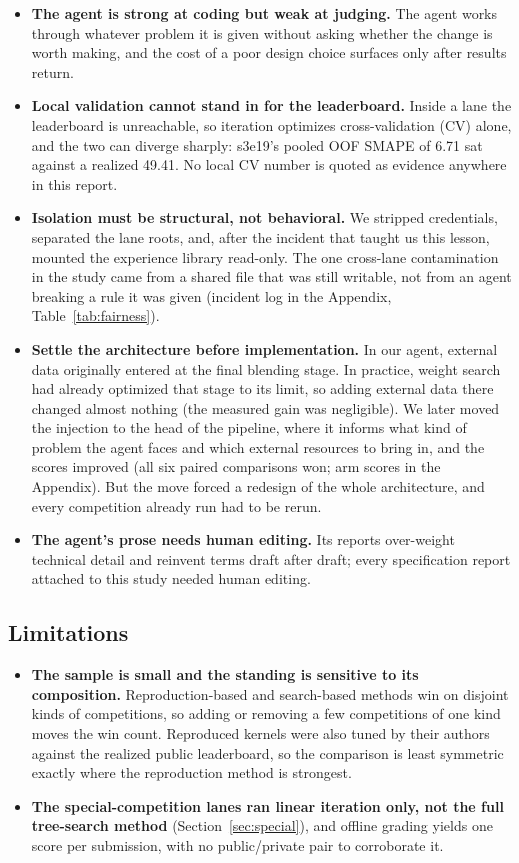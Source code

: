 \documentclass[11pt,a4paper]{article}
\begin{document}
\begin{itemize}[leftmargin=*]
  \item \textbf{The agent is strong at coding but weak at judging.} The agent works through whatever problem it is given without asking whether the change is worth making, and the cost of a poor design choice surfaces only after results return.
  \item \textbf{Local validation cannot stand in for the leaderboard.} Inside a lane the leaderboard is unreachable, so iteration optimizes cross-validation (CV) alone, and the two can diverge sharply: s3e19's pooled OOF SMAPE of 6.71 sat against a realized 49.41. No local CV number is quoted as evidence anywhere in this report.
  \item \textbf{Isolation must be structural, not behavioral.} We stripped credentials, separated the lane roots, and, after the incident that taught us this lesson, mounted the experience library read-only. The one cross-lane contamination in the study came from a shared file that was still writable, not from an agent breaking a rule it was given (incident log in the Appendix, Table~\ref{tab:fairness}).
  \item \textbf{Settle the architecture before implementation.} In our agent, external data originally entered at the final blending stage. In practice, weight search had already optimized that stage to its limit, so adding external data there changed almost nothing (the measured gain was negligible). We later moved the injection to the head of the pipeline, where it informs what kind of problem the agent faces and which external resources to bring in, and the scores improved (all six paired comparisons won; arm scores in the Appendix). But the move forced a redesign of the whole architecture, and every competition already run had to be rerun.
  \item \textbf{The agent's prose needs human editing.} Its reports over-weight technical detail and reinvent terms draft after draft; every specification report attached to this study needed human editing.
\end{itemize}

\subsection{Limitations}
\label{sec:limitations}

\begin{itemize}[leftmargin=*]
  \item \textbf{The sample is small and the standing is sensitive to its composition.} Reproduction-based and search-based methods win on disjoint kinds of competitions, so adding or removing a few competitions of one kind moves the win count. Reproduced kernels were also tuned by their authors against the realized public leaderboard, so the comparison is least symmetric exactly where the reproduction method is strongest.
  \item \textbf{The special-competition lanes ran linear iteration only, not the full tree-search method} (Section~\ref{sec:special}), and offline grading yields one score per submission, with no public/private pair to corroborate it.
\end{itemize}
\end{document}
